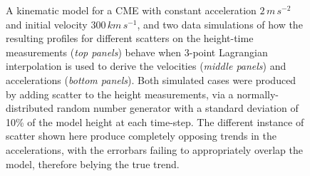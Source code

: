\documentclass[structabstract]{aa}
\begin{document}
\begin{figure}[!t]
\caption{A kinematic model for a CME with constant acceleration $2\,m\,s^{-2}$ and initial velocity $300\,km\,s^{-1}$, and two data simulations of how the resulting profiles for different scatters on the height-time measurements (\emph{top panels}) behave when 3-point Lagrangian interpolation is used to derive the velocities (\emph{middle panels}) and accelerations (\emph{bottom panels}). Both simulated cases were produced by adding scatter to the height measurements, via a normally-distributed random number generator with a standard deviation of 10\% of the model height at each time-step. The different instance of scatter shown here produce completely opposing trends in the accelerations, with the errorbars failing to appropriately overlap the model, therefore belying the true trend.}
\label{sim_vels_thesis}
\end{figure}
\end{document}
